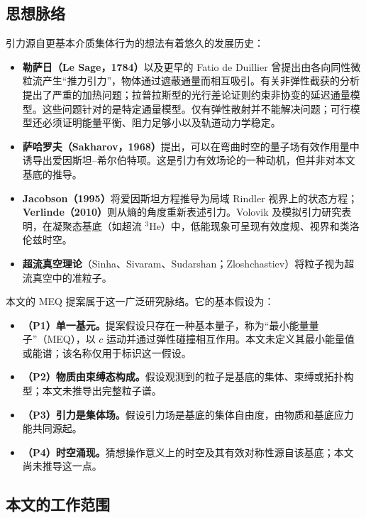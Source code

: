 \documentclass[UTF8,fontset=none,11pt,a4paper]{ctexart}
\begin{document}
\subsection{思想脉络}

引力源自更基本介质集体行为的想法有着悠久的发展历史：
\begin{itemize}
\item \textbf{勒萨日（Le Sage，1784）}以及更早的 Fatio de Duillier 曾提出由各向同性微粒流产生“推力引力”，物体通过遮蔽通量而相互吸引。有关非弹性截获的分析提出了严重的加热问题；拉普拉斯型的光行差论证则约束非协变的延迟通量模型\cite{LeSage2002,Poincare1908}。这些问题针对的是特定通量模型。仅有弹性散射并不能解决问题；可行模型还必须证明能量平衡、阻力足够小以及轨道动力学稳定。
\item \textbf{萨哈罗夫（Sakharov，1968）}提出，可以在弯曲时空的量子场有效作用量中诱导出爱因斯坦--希尔伯特项\cite{Sakharov1968}。这是引力有效场论的一种动机，但并非对本文基底的推导\cite{Donoghue1994}。
\item \textbf{Jacobson（1995）}将爱因斯坦方程推导为局域 Rindler 视界上的状态方程\cite{Jacobson1995}；\textbf{Verlinde（2010）}则从熵的角度重新表述引力\cite{Verlinde2011}。Volovik 及模拟引力研究表明，在凝聚态基底（如超流 $^3$He）中，低能现象可呈现有效度规、视界和类洛伦兹时空\cite{Volovik2003,Barcelo2005}。
\item \textbf{超流真空理论}（Sinha、Sivaram、Sudarshan；Zloshchastiev）将粒子视为超流真空中的准粒子\cite{Sinha1976,Zloshchastiev2011}。
\end{itemize}
本文的 MEQ 提案属于这一广泛研究脉络。它的基本假设为：
\begin{itemize}
\item \textbf{（P1）单一基元。}提案假设只存在一种基本量子，称为“最小能量量子”（MEQ），以 $c$ 运动并通过弹性碰撞相互作用。本文未定义其最小能量值或能谱；该名称仅用于标识这一假设。
\item \textbf{（P2）物质由束缚态构成。}假设观测到的粒子是基底的集体、束缚或拓扑构型；本文未推导出完整粒子谱。
\item \textbf{（P3）引力是集体场。}假设引力场是基底的集体自由度，由物质和基底应力能共同源起。
\item \textbf{（P4）时空涌现。}猜想操作意义上的时空及其有效对称性源自该基底；本文尚未推导这一点。
\end{itemize}

\subsection{本文的工作范围}
\end{document}
